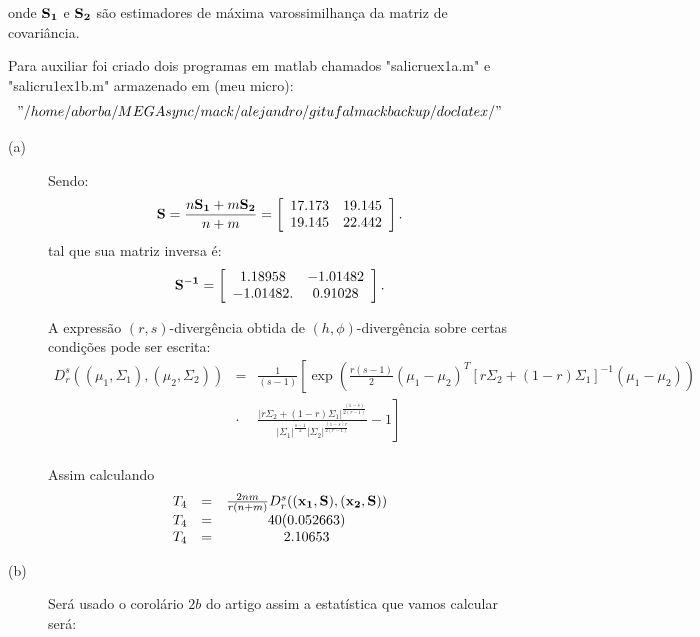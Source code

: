 \documentclass[12pt,a4paper]{article}
\begin{document}
onde ${\bf S_1}$ e ${\bf S_2}$ são estimadores de máxima varossimilhança da matriz de covariância.

Para auxiliar foi criado dois programas em matlab chamados "salicruex1a.m" e "salicru1ex1b.m" armazenado em (meu micro): $$"/home/aborba/MEGAsync/mack/alejandro/gitufalmackbackup/doclatex/"$$


\begin{description}
\item[(a)] Sendo:
$$
		{\bf S}=\frac{n{\bf S_1}+m{\bf S_2}}{n+m} = \left[
\begin{array}{cc}
	 17.173  & 19.145   \\
         19.145  & 22.442   \\
\end{array}
\right].
$$
tal que sua matriz inversa é:
$$
		{\bf S^{-1}} = \left[
\begin{array}{cc}
	 1.18958  & -1.01482   \\
        -1.01482.  & 0.91028   \\
\end{array}
\right].
$$

		A expressão $(r,s)$-divergência obtida de $(h,\phi)$-divergência sobre certas condições pode ser escrita:
\begin{equation}\label{sec3eqn2}
\begin{array}{ccl}
	D_r^s((\mu_1,\Sigma_1),(\mu_2,\Sigma_2))&=&\frac{1}{(s-1)}\left[\exp\left(\frac{r(s-1)}{2}(\mu_1-\mu_2)^{T}[r\Sigma_2+(1-r)\Sigma_1]^{-1}(\mu_1-\mu_2) \right)\right. \\
	&\cdot&\left.\frac{|r\Sigma_2+(1-r)\Sigma_1|^{\frac{(1-s)}{2(r-1)}}}{|\Sigma_1|^{\frac{s-1}{2}}|\Sigma_2|^{\frac{(1-s)r}{2(r-1)}}}-1\right]  \\
\end{array}
\end{equation}

Assim calculando
\begin{equation}\label{sec3eqn3}
\begin{array}{ccc}
	T_4&=&\frac{2nm}{r(n+m)}D_r^s(({\bf x_1}, {\bf S}),({\bf x_2}, {\bf S})) \\
	T_4&=&40(0.052663) \\
	T_4&=&2.10653
\end{array}
\end{equation}
\item[(b)] Será usado o corolário $2b$ do artigo \cite{salicru_pardo_1994} assim a estatística que vamos calcular será:


\end{description}
\end{document}
